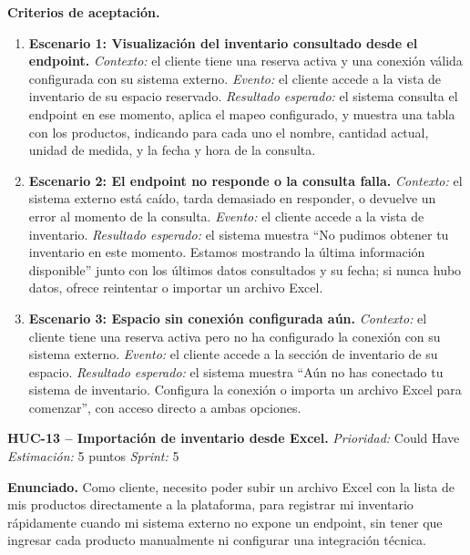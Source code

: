 \textbf{Criterios de aceptación.}
\begin{enumerate}
\item \textbf{Escenario 1: Visualización del inventario consultado desde el endpoint.} \textit{Contexto:} el cliente tiene una reserva activa y una conexión válida configurada con su sistema externo. \textit{Evento:} el cliente accede a la vista de inventario de su espacio reservado. \textit{Resultado esperado:} el sistema consulta el endpoint en ese momento, aplica el mapeo configurado, y muestra una tabla con los productos, indicando para cada uno el nombre, cantidad actual, unidad de medida, y la fecha y hora de la consulta.
\item \textbf{Escenario 2: El endpoint no responde o la consulta falla.} \textit{Contexto:} el sistema externo está caído, tarda demasiado en responder, o devuelve un error al momento de la consulta. \textit{Evento:} el cliente accede a la vista de inventario. \textit{Resultado esperado:} el sistema muestra ``No pudimos obtener tu inventario en este momento. Estamos mostrando la última información disponible'' junto con los últimos datos consultados y su fecha; si nunca hubo datos, ofrece reintentar o importar un archivo Excel.
\item \textbf{Escenario 3: Espacio sin conexión configurada aún.} \textit{Contexto:} el cliente tiene una reserva activa pero no ha configurado la conexión con su sistema externo. \textit{Evento:} el cliente accede a la sección de inventario de su espacio. \textit{Resultado esperado:} el sistema muestra ``Aún no has conectado tu sistema de inventario. Configura la conexión o importa un archivo Excel para comenzar'', con acceso directo a ambas opciones.
\end{enumerate}

\textbf{HUC-13 -- Importación de inventario desde Excel.} \label{req:HUC-13}
\textit{Prioridad:} Could Have \quad \textit{Estimación:} 5 puntos \quad \textit{Sprint:} 5

\textbf{Enunciado.} Como cliente, necesito poder subir un archivo Excel con la lista de mis productos directamente a la plataforma, para registrar mi inventario rápidamente cuando mi sistema externo no expone un endpoint, sin tener que ingresar cada producto manualmente ni configurar una integración técnica.

